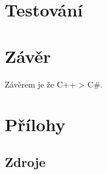 \documentclass[12pt,a4paper,titlepage]{scrreprt}
\begin{document}
	
	\chapter{Testování}
	
	
	\chapter{Závěr}
	Závěrem je že C++ > C\#.

	\newpage
	\chapter{Přílohy}
	\section*{Zdroje}
\end{document}
